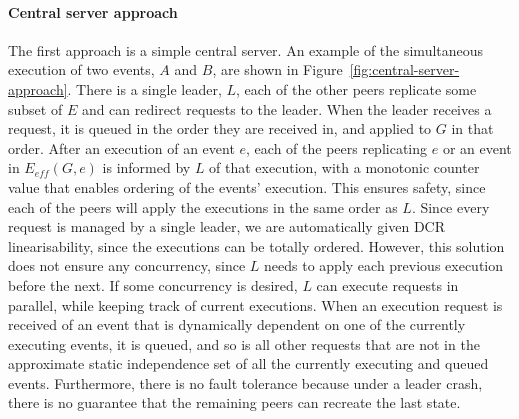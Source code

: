 \documentclass{article}
\begin{document}
	\paragraph{Central server approach}
	The first approach is a simple central server.
    An example of the simultaneous execution of two events, $A$ and $B$, are shown in Figure~\ref{fig:central-server-approach}.
	There is a single leader, $L$, each of the other peers replicate some subset of $E$ and can redirect requests to the leader.
	When the leader receives a request, it is queued in the order they are received in, and applied to $G$ in that order.
	After an execution of an event $e$, each of the peers replicating $e$ or an event in $E_{eff}(G,e)$ is informed by $L$ of that execution, with a monotonic counter value that enables ordering of the events' execution.
	This ensures safety, since each of the peers will apply the executions in the same order as $L$.
	Since every request is managed by a single leader, we are automatically given DCR linearisability, since the executions can be totally ordered.
	However, this solution does not ensure any concurrency, since $L$ needs to apply each previous execution before the next.
	If some concurrency is desired, $L$ can execute requests in parallel, while keeping track of current executions.
	When an execution request is received of an event that is dynamically dependent on one of the currently executing events, it is queued, and so is all other requests that are not in the approximate static independence set of all the currently executing and queued events.
	Furthermore, there is no fault tolerance because under a leader crash, there is no guarantee that the remaining peers can recreate the last state.
\end{document}
